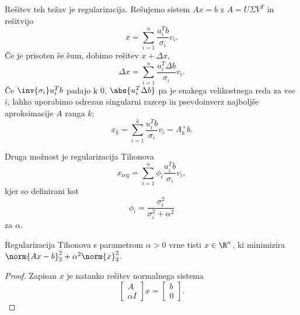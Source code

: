 Rešitev teh težav je regularizacija.
Rešujemo sistem $Ax = b$ z $A = U \Sigma V^T$ in rešitvijo
\[
  x = \sum_{i=1}^n \frac{u_i^T b}{\sigma_i} v_i.
\]
Če je prisoten še šum, dobimo rešitev $x + \Delta x$,
\[
  \Delta x = \sum_{i=1}^n \frac{u_i^T \Delta b}{\sigma_i} v_i.
\]
Če $\inv{\sigma_i} u_i^T b$ padajo k $0$, $\abs{u_i^T \Delta b}$ pa je enakega
velikostnega reda za vse $i$, lahko uporabimo odrezan singularni razcep in
psevdoinverz najboljše aproksimacije $A$ ranga $k$;
\[
  x_k = \sum_{i=1}^k \frac{u_i^T b}{\sigma_i} v_i = A_k^+ b.
\]

Druga možnost je regularizacija Tihonova
\[
  x_{\text{reg}} = \sum_{i=1}^n \phi_i \frac{u_i^T b}{\sigma_i} v_i,
\]
kjer so  definirani kot
\[
  \phi_i = \frac{\sigma_i^2}{\sigma_i^2 + \alpha^2}
\]
za  $\alpha$.

\begin{izrek}
  Regularizacija Tihonova s parametrom $\alpha > 0$ vrne tisti $x \in \R^n$, ki
  minimizira $\norm{Ax-b}_2^2 + \alpha^2 \norm{x}_2^2$.
\end{izrek}

\begin{proof}
  Zapisan $x$ je natanko rešitev normalnega sistema
  \[
	\begin{bmatrix}
	  A \\ \alpha I
	\end{bmatrix}
	x
	=
	\begin{bmatrix}
	  b \\ 0
	\end{bmatrix}.
  \]
\end{proof}


